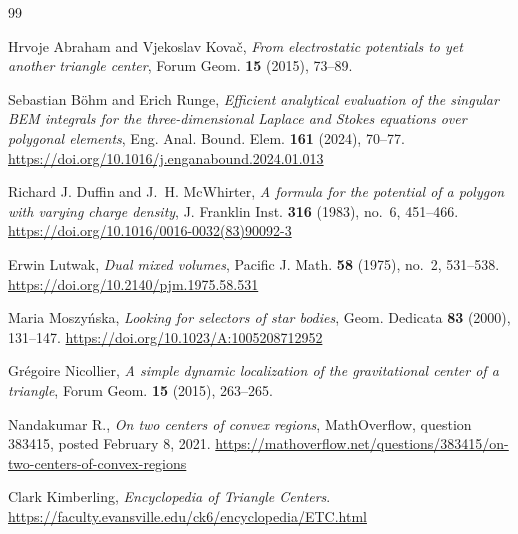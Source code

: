 \documentclass[11pt]{article}
\theoremstyle{remark}
\begin{document}
\begin{thebibliography}{99}
\raggedright

Hrvoje Abraham and Vjekoslav Kova\v{c},
\emph{From electrostatic potentials to yet another triangle center},
Forum Geom. \textbf{15} (2015), 73--89.

Sebastian B\"ohm and Erich Runge,
\emph{Efficient analytical evaluation of the singular BEM integrals
for the three-dimensional Laplace and Stokes equations over polygonal
elements},
Eng. Anal. Bound. Elem. \textbf{161} (2024), 70--77.
\url{https://doi.org/10.1016/j.enganabound.2024.01.013}

Richard J. Duffin and J.~H. McWhirter,
\emph{A formula for the potential of a polygon with varying charge
density},
J. Franklin Inst. \textbf{316} (1983), no.~6, 451--466.
\url{https://doi.org/10.1016/0016-0032(83)90092-3}

Erwin Lutwak,
\emph{Dual mixed volumes},
Pacific J. Math. \textbf{58} (1975), no.~2, 531--538.
\url{https://doi.org/10.2140/pjm.1975.58.531}

Maria Moszy\'nska,
\emph{Looking for selectors of star bodies},
Geom. Dedicata \textbf{83} (2000), 131--147.
\url{https://doi.org/10.1023/A:1005208712952}

Gr\'egoire Nicollier,
\emph{A simple dynamic localization of the gravitational center of a
triangle},
Forum Geom. \textbf{15} (2015), 263--265.


Nandakumar R.,
\emph{On two centers of convex regions},
MathOverflow, question 383415, posted February 8, 2021.
\url{https://mathoverflow.net/questions/383415/on-two-centers-of-convex-regions}

Clark Kimberling,
\emph{Encyclopedia of Triangle Centers}.
\url{https://faculty.evansville.edu/ck6/encyclopedia/ETC.html}

\end{thebibliography}
\end{document}
